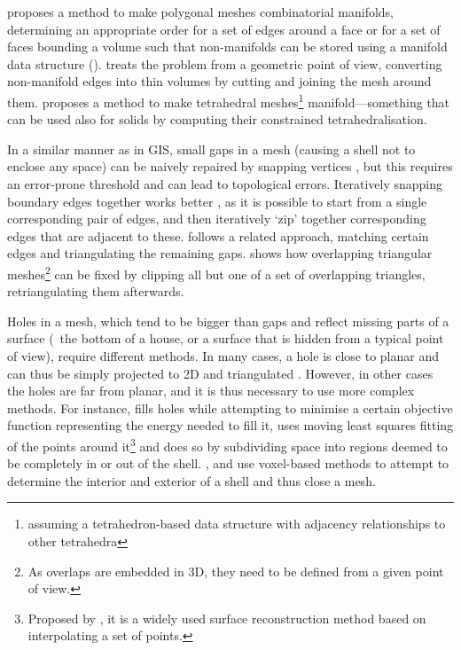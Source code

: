 \citet{Rossignac99a} proposes a method to make polygonal meshes combinatorial manifolds, determining an appropriate order for a set of edges around a face or for a set of faces bounding a volume such that non-manifolds can be stored using a manifold data structure ().
\citet{Gueziec01} treats the problem from a geometric point of view, converting non-manifold edges into thin volumes by cutting and joining the mesh around them.
\citet{Attene09} proposes a method to make tetrahedral meshes\footnote{assuming a tetrahedron-based data structure with adjacency relationships to other tetrahedra} manifold---something that can be used also for solids by computing their constrained tetrahedralisation.

In a similar manner as in GIS, small gaps in a mesh (causing a shell not to enclose any space) can be naively repaired by snapping vertices \citep{Rock92}, but this requires an error-prone threshold and can lead to topological errors.
Iteratively snapping boundary edges together works better \citep{Sheng95}, as it is possible to start from a single corresponding pair of edges, and then iteratively `zip' together corresponding edges that are adjacent to these.
\citet{Barequet95} follows a related approach, matching certain edges and triangulating the remaining gaps.
\citet{Turk94} shows how overlapping triangular meshes\footnote{As overlaps are embedded in 3D, they need to be defined from a given point of view.} can be fixed by clipping all but one of a set of overlapping triangles, retriangulating them afterwards.

Holes in a mesh, which tend to be bigger than gaps and reflect missing parts of a surface (\eg\ the bottom of a house, or a surface that is hidden from a typical point of view), require different methods.
In many cases, a hole is close to planar and can thus be simply projected to 2D and triangulated \citep{Bohn92}.
However, in other cases the holes are far from planar, and it is thus necessary to use more complex methods.
For instance, \citet{Levy03} fills holes while attempting to minimise a certain objective function representing the energy needed to fill it, \citet{Wang07} uses moving least squares fitting of the points around it\footnote{Proposed by \citet{Lancaster81}, it is a widely used surface reconstruction method based on interpolating a set of points.} and \citet{Podolak05} does so by subdividing space into regions deemed to be completely in or out of the shell.
\citet{Nooruddin03}, \citet{Bischoff05} and \citet{Hetroy11} use voxel-based methods to attempt to determine the interior and exterior of a shell and thus close a mesh.


